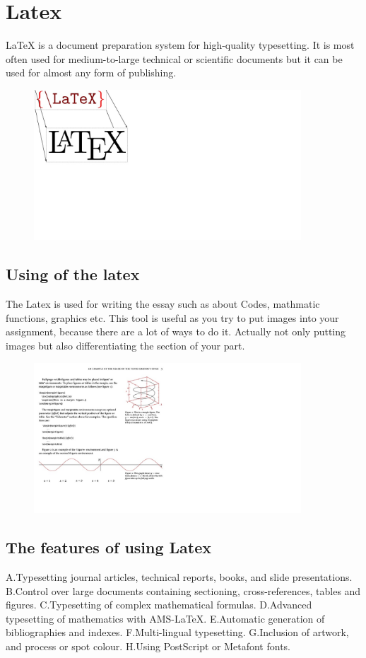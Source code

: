 \chapter{Latex}
LaTeX is a document preparation system for high-quality typesetting. It is most often used for medium-to-large technical or scientific documents but it can be used for almost any form of publishing. 

\marginnote
\begin{figure}	
    \includegraphics[width=10cm]{1}
\end{figure}

\section{Using of the latex}

The Latex is used for writing the essay such as about Codes, mathmatic functions, graphics etc. This tool is useful as you try to put images into your assignment, because there are a lot of ways to do it. Actually not only putting images but also differentiating the section of your part. 

\begin{figure}
\includegraphics[width=10cm]{123}
\end{figure}

\section{The features of using Latex}
A.Typesetting journal articles, technical reports, books, and slide presentations.
B.Control over large documents containing sectioning, cross-references, tables and figures.
C.Typesetting of complex mathematical formulas.
D.Advanced typesetting of mathematics with AMS-LaTeX.
E.Automatic generation of bibliographies and indexes.
F.Multi-lingual typesetting.
G.Inclusion of artwork, and process or spot colour.
H.Using PostScript or Metafont fonts.

